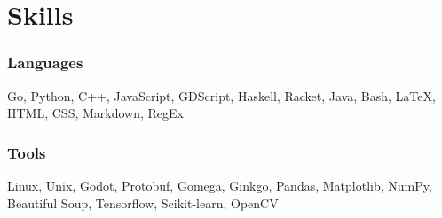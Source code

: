 \section{Skills}

\begin{resumeItem}
\subsubsection{Languages}
Go, Python, C++, JavaScript, GDScript, Haskell, Racket, Java, Bash, {\LaTeX}, HTML, CSS, Markdown, RegEx

\subsubsection{Tools}
Linux, Unix, Godot, Protobuf, Gomega, Ginkgo, Pandas, Matplotlib, NumPy, Beautiful Soup, Tensorflow, Scikit-learn, OpenCV
\end{resumeItem}

